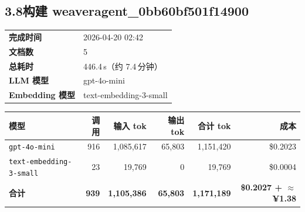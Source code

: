 \documentclass[11pt]{article}
\begin{document}
\subsection*{3.8\;构建 weaveragent\_0bb60bf501f14900}
\noindent\begin{minipage}{\textwidth}
\begin{tabular}{@{}ll@{}}
\textbf{完成时间} & 2026-04-20 02:42 \\
\textbf{文档数} & 5 \\
\textbf{总耗时} & 446.4\,s（约 7.4\,分钟） \\
\textbf{LLM 模型} & gpt-4o-mini \\
\textbf{Embedding 模型} & text-embedding-3-small \\
\end{tabular}
\end{minipage}
\par\vspace{0.25cm}
\noindent\begin{tabularx}{\textwidth}{@{}X r r r r r@{}}
\toprule
\rowcolor{headerbg!10}\textbf{模型} & \textbf{调用} & \textbf{输入 tok} & \textbf{输出 tok} & \textbf{合计 tok} & \textbf{成本} \\
\midrule
\rowcolor{rowalt}\texttt{\small gpt-4o-mini} & 916 & 1{,}085{,}617 & 65{,}803 & 1{,}151{,}420 & \$0.2023 \\
\texttt{\small text-embedding-3-small} & 23 & 19{,}769 & 0 & 19{,}769 & \$0.0004 \\
\midrule
\rowcolor{headerbg!15}\textbf{合计} & \textbf{939} & \textbf{1{,}105{,}386} & \textbf{65{,}803} & \textbf{1{,}171{,}189} & \textbf{\$0.2027 + $\approx$ ¥1.38} \\
\bottomrule
\end{tabularx}
\vspace{0.5cm}
\end{document}
